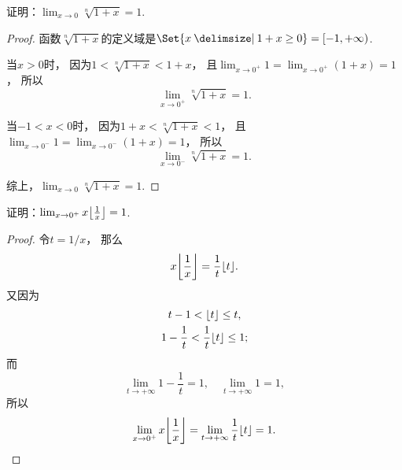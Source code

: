 \begin{example}
证明：\(\lim_{x\to0} \sqrt[n]{1+x} = 1\).
\begin{proof}
函数\(\sqrt[n]{1+x}\)的定义域是\(\Set{ x \given 1+x\geq 0 } = [-1,+\infty)\).

当\(x > 0\)时，
因为\(1 < \sqrt[n]{1+x} < 1+x\)，
且\(\lim_{x\to0^+} 1 = \lim_{x\to0^+}(1+x) = 1\)，
所以\begin{equation*}
	\lim_{x\to0^+} \sqrt[n]{1+x} = 1.
\end{equation*}

当\(-1 < x < 0\)时，
因为\(1+x < \sqrt[n]{1+x} < 1\)，
且\(\lim_{x\to0^-} 1 = \lim_{x\to0^-}(1+x) = 1\)，
所以\begin{equation*}
	\lim_{x\to0^-} \sqrt[n]{1+x} = 1.
\end{equation*}

综上，\(\lim_{x\to0} \sqrt[n]{1+x} = 1\).
\end{proof}
\end{example}

\begin{example}
证明：\(\lim_{x\to0^+} x \floor*{\frac1x} = 1\).
\begin{proof}
令\(t=1/x\)，
那么\begin{equation*}
	x \floor*{\frac1x} = \frac{1}{t} \floor{t}.
\end{equation*}
又因为\begin{gather*}
	t - 1 < \lfloor t\rfloor \leq t, \\
	1 - \frac{1}{t} < \frac{1}{t} \lfloor t\rfloor \leq 1;
\end{gather*}
而\begin{equation*}
	\lim_{t\to+\infty} 1 - \frac{1}{t} = 1,
	\quad
	\lim_{t\to+\infty} 1 = 1,
\end{equation*}
所以\begin{equation*}
	\lim_{x\to0^+} x \floor*{\frac1x} = \lim_{t\to+\infty} \frac{1}{t} \floor{t} = 1.
	\qedhere
\end{equation*}
\end{proof}
\end{example}


